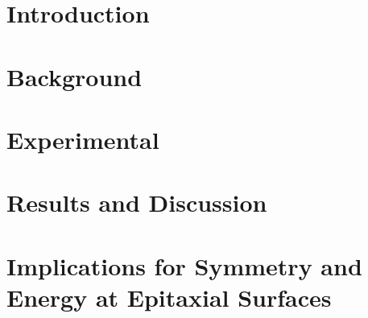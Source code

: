 \section{Introduction}

\section{Background}

\section{Experimental}

\section{Results and Discussion}

\section{Implications for Symmetry and Energy at Epitaxial Surfaces}

